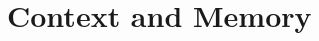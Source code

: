 \setcounter{chapter}{24}

\hypertarget{context-and-memory}{%
\chapter{Context and Memory}\label{context-and-memory}}
